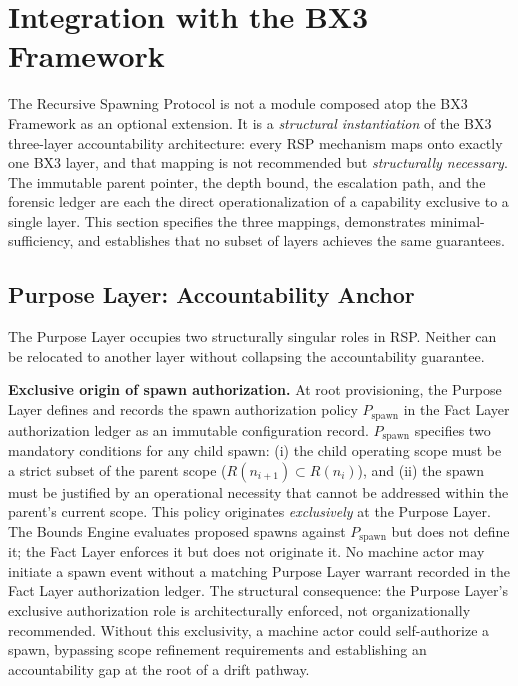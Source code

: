 \section{Integration with the BX3 Framework}
\label{sec:rs-integration}

The Recursive Spawning Protocol is not a module composed atop the BX3 Framework as an optional extension. It is a \emph{structural instantiation} of the BX3 three-layer accountability architecture: every RSP mechanism maps onto exactly one BX3 layer, and that mapping is not recommended but \emph{structurally necessary}. The immutable parent pointer, the depth bound, the escalation path, and the forensic ledger are each the direct operationalization of a capability exclusive to a single layer. This section specifies the three mappings, demonstrates minimal-sufficiency, and establishes that no subset of layers achieves the same guarantees.

\subsection{Purpose Layer: Accountability Anchor}
\label{sec:rs-purpose-anchor}

The Purpose Layer occupies two structurally singular roles in RSP. Neither can be relocated to another layer without collapsing the accountability guarantee.

\medskip
\noindent\textbf{Exclusive origin of spawn authorization.} At root provisioning, the Purpose Layer defines and records the spawn authorization policy $P_{\mathrm{spawn}}$ in the Fact Layer authorization ledger as an immutable configuration record. $P_{\mathrm{spawn}}$ specifies two mandatory conditions for any child spawn: (i) the child operating scope must be a strict subset of the parent scope ($R(n_{i+1}) \subset R(n_i)$), and (ii) the spawn must be justified by an operational necessity that cannot be addressed within the parent's current scope. This policy originates \emph{exclusively} at the Purpose Layer. The Bounds Engine evaluates proposed spawns against $P_{\mathrm{spawn}}$ but does not define it; the Fact Layer enforces it but does not originate it. No machine actor may initiate a spawn event without a matching Purpose Layer warrant recorded in the Fact Layer authorization ledger. The structural consequence: the Purpose Layer's exclusive authorization role is architecturally enforced, not organizationally recommended. Without this exclusivity, a machine actor could self-authorize a spawn, bypassing scope refinement requirements and establishing an accountability gap at the root of a drift pathway.

